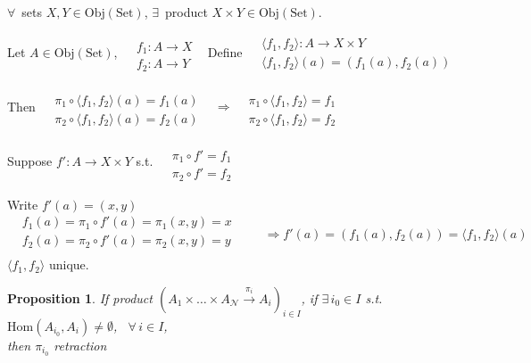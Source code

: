 \documentclass[twoside,landscape,10pt]{amsart}
\theoremstyle{plain}
\newtheorem{proposition}{Proposition}
\theoremstyle{definition}
\theoremstyle{remark}
\begin{document}
\begin{multicols*}{2}
$\forall \, $ sets $X,Y \in \text{Obj}(\text{Set})$, $\exists \, $ product $X\times Y \in \text{Obj}(\text{Set})$.  

Let $A \in \text{Obj}(\text{Set})$, $\begin{aligned} & \quad \\
  & f_1 : A \to X \\
  & f_2 : A \to Y \end{aligned}$ \qquad \, Define $\begin{aligned} & \langle f_1, f_2 \rangle : A \to X \times Y  \\
  & \langle f_1 ,f_2 \rangle (a) = (f_1(a), f_2(a)) \end{aligned}$

Then $\begin{aligned} & \quad \\
  & \pi_1 \circ \langle f_1 , f_2 \rangle (a) = f_1(a) \\
  & \pi_2 \circ \langle f_1, f_2 \rangle (a) = f_2(a) \end{aligned}$ \qquad \, $\Longrightarrow \begin{aligned}  & \quad \\
  & \pi_1 \circ \langle f_1 , f_2 \rangle = f_1 \\
  & \pi_2 \circ \langle f_1,f_2 \rangle = f_2 \end{aligned}$

Suppose $f': A \to X\times Y$ s.t. $\begin{aligned} & \quad \\
  & \pi_1 \circ f' = f_1 \\
  & \pi_2 \circ f' = f_2 \end{aligned}$

Write $f'(a) = (x,y)$
\[
\begin{aligned}
  & f_1(a) = \pi_1 \circ f'(a) = \pi_1(x,y) =x \\ 
  & f_2(a) = \pi_2 \circ f'(a) = \pi_2(x,y) =y \\ 
\end{aligned} \qquad \, \Longrightarrow f'(a) = (f_1(a), f_2(a)) = \langle f_1, f_2 \rangle (a)
\]
$\langle f_1, f_2 \rangle $ unique.  

\begin{proposition}
  If product $(A_1 \times \dots \times A_{\mathcal{N}} \xrightarrow{ \pi_i } A_i )_{i\in I}$, if $\exists \,  i_0 \in I$ s.t. $\text{Hom}(A_{i_0}, A_i) \neq \emptyset$, \, $\forall \, i \in I$, \\
then $\pi_{i_0}$ \emph{retraction }
\end{proposition}


\end{multicols*}
\end{document}
